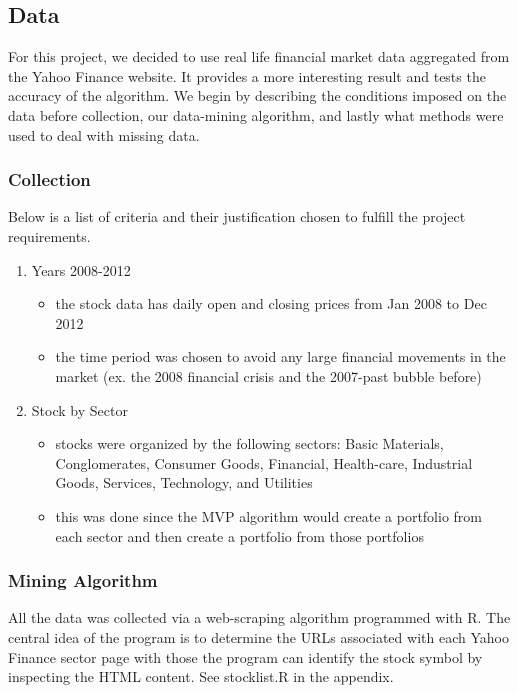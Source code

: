 \documentclass[12pt,titlepage,a4paper]{article}
\begin{document}
	\subsection{Data}
		For this project, we decided to use real life financial market data aggregated from the Yahoo Finance website. It provides a more interesting result and tests the accuracy of the algorithm. We begin by describing the conditions imposed on the data before collection, our data-mining algorithm, and lastly what methods were used to deal with missing data.
		\subsubsection{Collection}
			Below is a list of criteria and their justification chosen to fulfill the project requirements. 
			\begin{enumerate}
				\item Years 2008-2012
				\begin{itemize}
					\item the stock data has daily open and closing prices from Jan 2008 to Dec 2012
					\item the time period was chosen to avoid any large financial movements in the market (ex. the 2008 financial crisis and the 2007-past bubble before)
				\end{itemize}
					\item Stock by Sector
				\begin{itemize}
					\item stocks were organized by the following sectors: Basic Materials, Conglomerates, Consumer Goods, Financial, Health-care, Industrial Goods, Services, Technology, and Utilities
					\item this was done since the MVP algorithm would create a portfolio from each sector and then create a portfolio from those portfolios
				\end{itemize}
			\end{enumerate}

		\subsubsection{Mining Algorithm}
			All the data was collected via a web-scraping algorithm programmed with R. The central idea of the program is to determine the URLs associated with each Yahoo Finance sector page with those the program can identify the stock symbol by inspecting the HTML content. See stocklist.R in the appendix.\\
\end{document}
